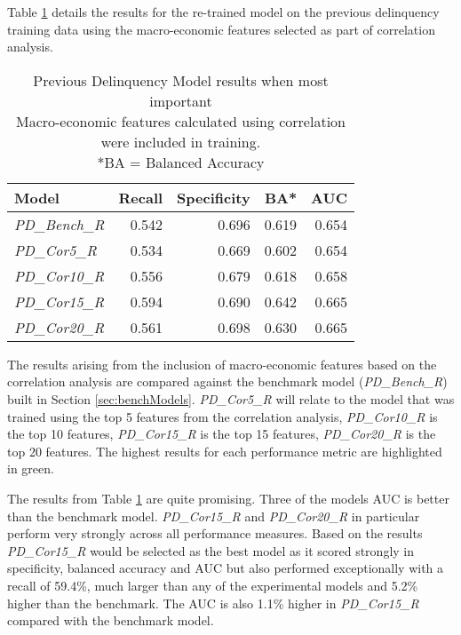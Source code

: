 Table \ref{table:PDCorrModelResults} details the results for the
re-trained model on the previous delinquency training data using the macro-economic features selected as part of correlation analysis.

\begin{table}[H]
\centering
\small
		\begin{tabular}{l r r r r}
			\hline
			\textbf{Model} & \textbf{Recall} & \textbf{Specificity} & \textbf{BA*} & \textbf{AUC}  \\ \hline
			\textit{PD\_Bench\_R} & 0.542 & 0.696 & 0.619 & 0.654 \\ \hline
			\textit{PD\_Cor5\_R}  & 0.534 & 0.669 & 0.602 & 0.654   \\ 
			\textit{PD\_Cor10\_R} & 0.556 & 0.679 & 0.618 & 0.658  \\ 
			\textit{PD\_Cor15\_R} & \cellcolor{green!25}0.594 & 0.690 & \cellcolor{green!25}0.642 & 0.665  \\
			\textit{PD\_Cor20\_R} & 0.561 & \cellcolor{green!25}0.698 & 0.630 & \cellcolor{green!25}0.665  \\\hline
		\end{tabular}
	\caption{Previous Delinquency Model results when most important \\Macro-economic features calculated using correlation were included in training.\\
		*BA = Balanced Accuracy}
	\label{table:PDCorrModelResults}
\end{table}

The results arising from the inclusion of macro-economic features based on the correlation analysis are compared against the benchmark model (\textit{PD\_Bench\_R}) built in Section \ref{sec:benchModels}. \textit{PD\_Cor5\_R} will relate to the model that was trained using the top 5 features from the correlation analysis, \textit{PD\_Cor10\_R} is the top 10 features, \textit{PD\_Cor15\_R} is the top 15 features, \textit{PD\_Cor20\_R} is the top 20 features. The highest results for each performance metric are highlighted in green.

The results from Table \ref{table:PDCorrModelResults} are quite promising. Three of the models AUC is better than the benchmark model. \textit{PD\_Cor15\_R} and \textit{PD\_Cor20\_R} in particular perform very strongly across all performance measures. Based on the results \textit{PD\_Cor15\_R} would be selected as the best model as it scored strongly in specificity, balanced accuracy and AUC but also performed exceptionally with a recall of 59.4\%, much larger than any of the experimental models and 5.2\% higher than the benchmark. The AUC is also 1.1\% higher in \textit{PD\_Cor15\_R} compared with the benchmark model.


